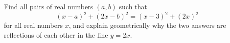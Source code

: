 Find all pairs of real numbers $(a,b)$ such that
\[(x-a)^2+(2x-b)^2=(x-3)^2+(2x)^2\]
for all real numbers $x$, and explain geometrically why the two answers are reflections of each other in the line $y=2x$.
